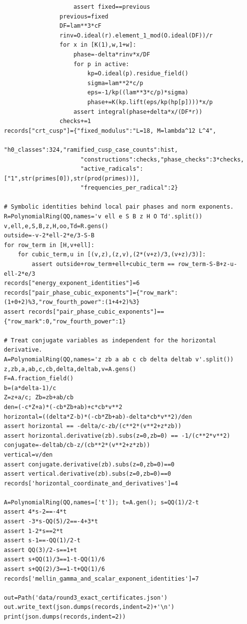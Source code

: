 \documentclass[12pt]{article}
\begin{document}
\begin{verbatim}
                    assert fixed==previous
                previous=fixed
                DF=lam**3*cF
                rinv=O.ideal(r).element_1_mod(O.ideal(DF))/r
                for x in [K(1),w,1+w]:
                    phase=-delta*rinv*x/DF
                    for p in active:
                        kp=O.ideal(p).residue_field()
                        sigma=lam**2*c/p
                        eps=-1/kp((lam**3*c/p)*sigma)
                        phase+=K(kp.lift(eps/kp(hp[p])))*x/p
                    assert integral(phase+delta*x/(DF*r))
                checks+=1
records["crt_cusp"]={"fixed_modulus":"L=18, M=lambda^12 L^4",
                      "h0_classes":324,"ramified_cusp_case_counts":hist,
                      "constructions":checks,"phase_checks":3*checks,
                      "active_radicals":["1",str(primes[0]),str(prod(primes))],
                      "frequencies_per_radical":2}

# Symbolic identities behind local pair phases and norm exponents.
R=PolynomialRing(QQ,names='v ell e S B z H O Td'.split())
v,ell,e,S,B,z,H,oo,Td=R.gens()
outside=-v-2*ell-2*e/3-S-B
for row_term in [H,v+ell]:
    for cubic_term,u in [(v,z),(z,v),(2*(v+z)/3,(v+z)/3)]:
        assert outside+row_term+ell+cubic_term == row_term-S-B+z-u-ell-2*e/3
records["energy_exponent_identities"]=6
records["pair_phase_cubic_exponents"]={"row_mark":(1+0+2)%3,"row_fourth_power":(1+4+2)%3}
assert records["pair_phase_cubic_exponents"]=={"row_mark":0,"row_fourth_power":1}

# Treat conjugate variables as independent for the horizontal derivative.
A=PolynomialRing(QQ,names='z zb a ab c cb delta deltab v'.split())
z,zb,a,ab,c,cb,delta,deltab,v=A.gens()
F=A.fraction_field()
b=(a*delta-1)/c
Z=z+a/c; Zb=zb+ab/cb
den=(-c*Z+a)*(-cb*Zb+ab)+c*cb*v**2
horizontal=((delta*Z-b)*(-cb*Zb+ab)-delta*cb*v**2)/den
assert horizontal == -delta/c-zb/(c**2*(v**2+z*zb))
assert horizontal.derivative(zb).subs(z=0,zb=0) == -1/(c**2*v**2)
conjugate=-deltab/cb-z/(cb**2*(v**2+z*zb))
vertical=v/den
assert conjugate.derivative(zb).subs(z=0,zb=0)==0
assert vertical.derivative(zb).subs(z=0,zb=0)==0
records['horizontal_coordinate_and_derivatives']=4

A=PolynomialRing(QQ,names=['t']); t=A.gen(); s=QQ(1)/2-t
assert 4*s-2==-4*t
assert -3*s-QQ(5)/2==-4+3*t
assert 1-2*s==2*t
assert s-1==-QQ(1)/2-t
assert QQ(3)/2-s==1+t
assert s+QQ(1)/3==1-t-QQ(1)/6
assert s+QQ(2)/3==1-t+QQ(1)/6
records['mellin_gamma_and_scalar_exponent_identities']=7

out=Path('data/round3_exact_certificates.json')
out.write_text(json.dumps(records,indent=2)+'\n')
print(json.dumps(records,indent=2))

\end{verbatim}
\end{document}
